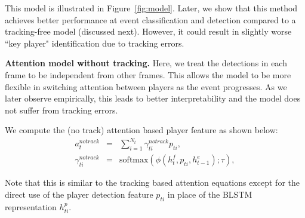 This model is illustrated in Figure~\ref{fig:model}.
Later, we show that this method achieves better
performance at event classification and detection compared to a
tracking-free model (discussed next). However, it could result in slightly worse ``key player"
identification due to tracking errors.

\noindent \textbf{Attention model without tracking.}
Here, we treat the detections in each frame to be independent from other
frames.  This allows the model to be more flexible in switching attention
between players as the event progresses.  As we later observe empirically, this
leads to better interpretability and the model does not suffer from
tracking errors.

We  compute the (no track) attention based player feature as shown below:
\begin{eqnarray} 
\label{eq:notrack}
  a_t^{notrack} & = & \sum_{i=1}^{N_t} \gamma_{ti}^{notrack} p_{ti},
\\ \nonumber
  \gamma_{ti}^{notrack} & = & \text{softmax} \left(\phi\left(h^f_t, p_{ti}, h^e_{t-1}\right); \tau\right),
\end{eqnarray}

Note that this is similar to the tracking based attention equations except for
the direct use of the player detection feature $p_{ti}$ in place of the
BLSTM representation $h_{ti}^p$.
